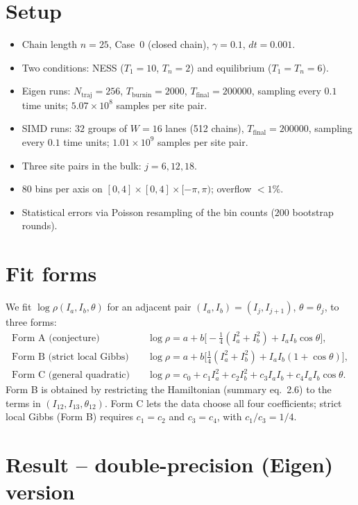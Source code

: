 \documentclass[11pt]{article}
\begin{document}
\section*{Setup}
\begin{itemize}
\item Chain length $n=25$, Case~0 (closed chain), $\gamma=0.1$, $dt=0.001$.
\item Two conditions: NESS ($T_1=10$, $T_n=2$) and equilibrium ($T_1=T_n=6$).
\item Eigen runs: $N_{\mathrm{traj}}=256$, $T_{\mathrm{burnin}}=2000$,
$T_{\mathrm{final}}=200000$, sampling every $0.1$ time units;
$5.07\times 10^8$ samples per site pair.
\item SIMD runs: $32$ groups of $W=16$ lanes (512 chains),
$T_{\mathrm{final}}=200000$, sampling every $0.1$ time units;
$1.01\times 10^9$ samples per site pair.
\item Three site pairs in the bulk: $j=6, 12, 18$.
\item $80$ bins per axis on $[0,4]\times[0,4]\times[-\pi,\pi)$; overflow $<1\%$.
\item Statistical errors via Poisson resampling of the bin counts
($200$ bootstrap rounds).
\end{itemize}

\section*{Fit forms}
We fit $\log\rho(I_a,I_b,\theta)$ for an adjacent pair $(I_a,I_b)=(I_j,I_{j+1})$,
$\theta=\theta_j$, to three forms:
\begin{align*}
\text{Form A (conjecture)}\quad
& \log\rho = a + b\bigl[-\tfrac{1}{4}(I_a^2+I_b^2) + I_a I_b\cos\theta\bigr], \\
\text{Form B (strict local Gibbs)}\quad
& \log\rho = a + b\bigl[\tfrac{1}{4}(I_a^2+I_b^2) + I_a I_b(1+\cos\theta)\bigr], \\
\text{Form C (general quadratic)}\quad
& \log\rho = c_0 + c_1 I_a^2 + c_2 I_b^2 + c_3 I_a I_b + c_4 I_a I_b\cos\theta .
\end{align*}
Form B is obtained by restricting the Hamiltonian (summary eq.~2.6) to the terms
in $(I_{12}, I_{13}, \theta_{12})$. Form C lets the data choose all four
coefficients; strict local Gibbs (Form B) requires $c_1=c_2$ and $c_3=c_4$, with
$c_1/c_3 = 1/4$.

\section*{Result -- double-precision (Eigen) version}
\end{document}

